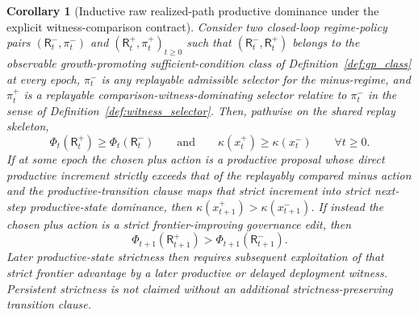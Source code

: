 \documentclass[11pt]{article}
\newtheorem{corollary}[theorem]{Corollary}
\theoremstyle{definition}
\newcommand{\1}{\mathbf{1}}
\begin{document}
\begin{corollary}[Inductive raw realized-path productive dominance under the explicit witness-comparison contract]\label{cor:realized_growth}
Consider two closed-loop regime-policy pairs $(\mathsf R_t^-,\pi_t^-)$ and $(\mathsf R_t^+,\pi_t^+)_{t\ge 0}$ such that $(\mathsf R_t^-,\mathsf R_t^+)$ belongs to the observable growth-promoting sufficient-condition class of Definition~\ref{def:gp_class} at every epoch, $\pi_t^-$ is any replayable admissible selector for the minus-regime, and $\pi_t^+$ is a replayable comparison-witness-dominating selector relative to $\pi_t^-$ in the sense of Definition~\ref{def:witness_selector}. Then, pathwise on the shared replay skeleton,
\[
\Phi_t(\mathsf R_t^+)\ge \Phi_t(\mathsf R_t^-)\qquad\text{and}\qquad\kappa(x_t^+)\ge \kappa(x_t^-)\qquad \forall t\ge 0.
\]
If at some epoch the chosen plus action is a productive proposal whose direct productive increment strictly exceeds that of the replayably compared minus action and the productive-transition clause maps that strict increment into strict next-step productive-state dominance, then $\kappa(x_{t+1}^+)>\kappa(x_{t+1}^-)$. If instead the chosen plus action is a strict frontier-improving governance edit, then
\[
\Phi_{t+1}(\mathsf R_{t+1}^+)>\Phi_{t+1}(\mathsf R_{t+1}^-).
\]
Later productive-state strictness then requires subsequent exploitation of that strict frontier advantage by a later productive or delayed deployment witness. Persistent strictness is not claimed without an additional strictness-preserving transition clause.
\end{corollary}
\end{document}
